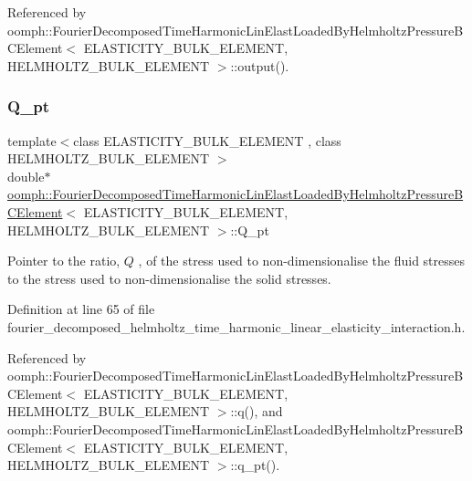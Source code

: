 Referenced by oomph\+::\+Fourier\+Decomposed\+Time\+Harmonic\+Lin\+Elast\+Loaded\+By\+Helmholtz\+Pressure\+B\+C\+Element$<$ E\+L\+A\+S\+T\+I\+C\+I\+T\+Y\+\_\+\+B\+U\+L\+K\+\_\+\+E\+L\+E\+M\+E\+N\+T, H\+E\+L\+M\+H\+O\+L\+T\+Z\+\_\+\+B\+U\+L\+K\+\_\+\+E\+L\+E\+M\+E\+N\+T $>$\+::output().

\mbox{\label{classoomph_1_1FourierDecomposedTimeHarmonicLinElastLoadedByHelmholtzPressureBCElement_ae9ffef6c7b99dcac84a59345b88e2938}} 
\subsubsection{\texorpdfstring{Q\+\_\+pt}{Q\_pt}}
{\footnotesize\ttfamily template$<$class E\+L\+A\+S\+T\+I\+C\+I\+T\+Y\+\_\+\+B\+U\+L\+K\+\_\+\+E\+L\+E\+M\+E\+NT , class H\+E\+L\+M\+H\+O\+L\+T\+Z\+\_\+\+B\+U\+L\+K\+\_\+\+E\+L\+E\+M\+E\+NT $>$ \\
double$\ast$ \hyperlink{classoomph_1_1FourierDecomposedTimeHarmonicLinElastLoadedByHelmholtzPressureBCElement}{oomph\+::\+Fourier\+Decomposed\+Time\+Harmonic\+Lin\+Elast\+Loaded\+By\+Helmholtz\+Pressure\+B\+C\+Element}$<$ E\+L\+A\+S\+T\+I\+C\+I\+T\+Y\+\_\+\+B\+U\+L\+K\+\_\+\+E\+L\+E\+M\+E\+NT, H\+E\+L\+M\+H\+O\+L\+T\+Z\+\_\+\+B\+U\+L\+K\+\_\+\+E\+L\+E\+M\+E\+NT $>$\+::Q\+\_\+pt\hspace{0.3cm}{\ttfamily [protected]}}



Pointer to the ratio, $ Q $ , of the stress used to non-\/dimensionalise the fluid stresses to the stress used to non-\/dimensionalise the solid stresses. 



Definition at line 65 of file fourier\+\_\+decomposed\+\_\+helmholtz\+\_\+time\+\_\+harmonic\+\_\+linear\+\_\+elasticity\+\_\+interaction.\+h.



Referenced by oomph\+::\+Fourier\+Decomposed\+Time\+Harmonic\+Lin\+Elast\+Loaded\+By\+Helmholtz\+Pressure\+B\+C\+Element$<$ E\+L\+A\+S\+T\+I\+C\+I\+T\+Y\+\_\+\+B\+U\+L\+K\+\_\+\+E\+L\+E\+M\+E\+N\+T, H\+E\+L\+M\+H\+O\+L\+T\+Z\+\_\+\+B\+U\+L\+K\+\_\+\+E\+L\+E\+M\+E\+N\+T $>$\+::q(), and oomph\+::\+Fourier\+Decomposed\+Time\+Harmonic\+Lin\+Elast\+Loaded\+By\+Helmholtz\+Pressure\+B\+C\+Element$<$ E\+L\+A\+S\+T\+I\+C\+I\+T\+Y\+\_\+\+B\+U\+L\+K\+\_\+\+E\+L\+E\+M\+E\+N\+T, H\+E\+L\+M\+H\+O\+L\+T\+Z\+\_\+\+B\+U\+L\+K\+\_\+\+E\+L\+E\+M\+E\+N\+T $>$\+::q\+\_\+pt().

